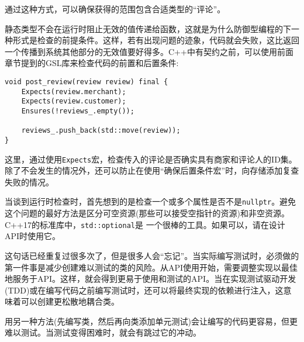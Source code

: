 通过这种方式，可以确保获得的范围包含合适类型的“评论”。

静态类型不会在运行时阻止无效的值传递给函数，这就是为什么防御型编程的下一种形式是检查的前提条件。这样，若有出现问题的迹象，代码就会失败，这比返回一个传播到系统其他部分的无效值要好得多。C++中有契约之前，可以使用前面章节提到的GSL库来检查代码的前置和后置条件:

\begin{lstlisting}[style=styleCXX]
void post_review(review review) final {
	Expects(review.merchant);
	Expects(review.customer);
	Ensures(!reviews_.empty());
	
	reviews_.push_back(std::move(review));
}
\end{lstlisting}

这里，通过使用\texttt{Expects}宏，检查传入的评论是否确实具有商家和评论人的ID集。除了不会发生的情况外，还可以防止在使用“确保后置条件宏”时，向存储添加复查失败的情况。

当谈到运行时检查时，首先想到的是检查一个或多个属性是否不是\texttt{nullptr}。避免这个问题的最好方法是区分可空资源(那些可以接受空指针的资源)和非空资源。C++17的标准库中，\texttt{std::optional}是 一个很棒的工具。如果可以，请在设计API时使用它。


这句话已经重复过很多次了，但是很多人会“忘记”。当实际编写测试时，必须做的第一件事是减少创建难以测试的类的风险。从API使用开始，需要调整实现以最佳地服务于API。这样，就会得到更易于使用和测试的API。当在实现测试驱动开发(TDD)或在编写代码之前编写测试时，还可以将最终实现的依赖进行注入，这意味着可以创建更松散地耦合类。

用另一种方法(先编写类，然后再向类添加单元测试)会让编写的代码更容易，但更难以测试。当测试变得困难时，就会有跳过它的冲动。













